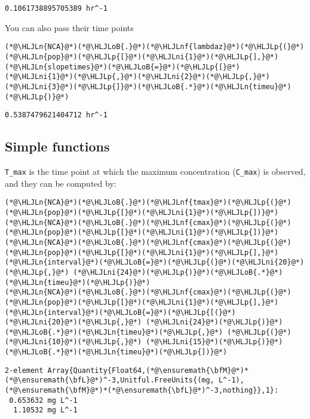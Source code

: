 \documentclass[12pt,a4paper]{article}
\newcommand{\HLJLn}[1]{#1}
\newcommand{\HLJLnf}[1]{\textcolor[RGB]{66,102,213}{#1}}
\newcommand{\HLJLni}[1]{\textcolor[RGB]{59,151,46}{#1}}
\newcommand{\HLJLoB}[1]{\textcolor[RGB]{102,102,102}{\textbf{#1}}}
\newcommand{\HLJLp}[1]{#1}
\begin{document}
\begin{lstlisting}
0.1061738895705389 hr^-1
\end{lstlisting}


You can also pass their time points


\begin{lstlisting}
(*@\HLJLn{NCA}@*)(*@\HLJLoB{.}@*)(*@\HLJLnf{lambdaz}@*)(*@\HLJLp{(}@*)(*@\HLJLn{pop}@*)(*@\HLJLp{[}@*)(*@\HLJLni{1}@*)(*@\HLJLp{],}@*) (*@\HLJLn{slopetimes}@*)(*@\HLJLoB{=}@*)(*@\HLJLp{[}@*)(*@\HLJLni{1}@*)(*@\HLJLp{,}@*)(*@\HLJLni{2}@*)(*@\HLJLp{,}@*)(*@\HLJLni{3}@*)(*@\HLJLp{]}@*)(*@\HLJLoB{.*}@*)(*@\HLJLn{timeu}@*)(*@\HLJLp{)}@*)
\end{lstlisting}

\begin{lstlisting}
0.5387479621404712 hr^-1
\end{lstlisting}


\subsection{Simple functions}
\texttt{T\_max} is the time point at which the maximum concentration (\texttt{C\_max}) is observed, and they can be computed by:


\begin{lstlisting}
(*@\HLJLn{NCA}@*)(*@\HLJLoB{.}@*)(*@\HLJLnf{tmax}@*)(*@\HLJLp{(}@*)(*@\HLJLn{pop}@*)(*@\HLJLp{[}@*)(*@\HLJLni{1}@*)(*@\HLJLp{])}@*)
(*@\HLJLn{NCA}@*)(*@\HLJLoB{.}@*)(*@\HLJLnf{cmax}@*)(*@\HLJLp{(}@*)(*@\HLJLn{pop}@*)(*@\HLJLp{[}@*)(*@\HLJLni{1}@*)(*@\HLJLp{])}@*)
(*@\HLJLn{NCA}@*)(*@\HLJLoB{.}@*)(*@\HLJLnf{cmax}@*)(*@\HLJLp{(}@*)(*@\HLJLn{pop}@*)(*@\HLJLp{[}@*)(*@\HLJLni{1}@*)(*@\HLJLp{],}@*) (*@\HLJLn{interval}@*)(*@\HLJLoB{=}@*)(*@\HLJLp{(}@*)(*@\HLJLni{20}@*)(*@\HLJLp{,}@*) (*@\HLJLni{24}@*)(*@\HLJLp{)}@*)(*@\HLJLoB{.*}@*)(*@\HLJLn{timeu}@*)(*@\HLJLp{)}@*)
(*@\HLJLn{NCA}@*)(*@\HLJLoB{.}@*)(*@\HLJLnf{cmax}@*)(*@\HLJLp{(}@*)(*@\HLJLn{pop}@*)(*@\HLJLp{[}@*)(*@\HLJLni{1}@*)(*@\HLJLp{],}@*) (*@\HLJLn{interval}@*)(*@\HLJLoB{=}@*)(*@\HLJLp{[(}@*)(*@\HLJLni{20}@*)(*@\HLJLp{,}@*) (*@\HLJLni{24}@*)(*@\HLJLp{)}@*)(*@\HLJLoB{.*}@*)(*@\HLJLn{timeu}@*)(*@\HLJLp{,}@*) (*@\HLJLp{(}@*)(*@\HLJLni{10}@*)(*@\HLJLp{,}@*) (*@\HLJLni{15}@*)(*@\HLJLp{)}@*)(*@\HLJLoB{.*}@*)(*@\HLJLn{timeu}@*)(*@\HLJLp{])}@*)
\end{lstlisting}

\begin{lstlisting}
2-element Array{Quantity{Float64,(*@\ensuremath{\bfM}@*)*(*@\ensuremath{\bfL}@*)^-3,Unitful.FreeUnits{(mg, L^-1),
(*@\ensuremath{\bfM}@*)*(*@\ensuremath{\bfL}@*)^-3,nothing}},1}:
 0.653632 mg L^-1
  1.10532 mg L^-1
\end{lstlisting}
\end{document}
